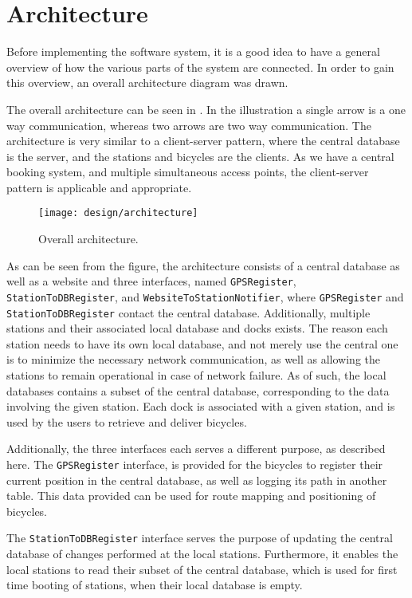\section{Architecture}\label{sec:architecture}
Before implementing the software system, it is a good idea to have a general overview of how the various parts of the system are connected.
In order to gain this overview, an overall architecture diagram was drawn.

The overall architecture can be seen in .
In the illustration a single arrow is a one way communication, whereas two arrows are two way communication.
The architecture is very similar to a client-server pattern, where the central database is the server, and the stations and bicycles are the clients.
As we have a central booking system, and multiple simultaneous access points, the client-server pattern is applicable and appropriate.

\begin{figure}[h]
	\centering
	\texttt{[image: design/architecture]}
	\caption{Overall architecture.}\label{fig:overallarch}
\end{figure}

As can be seen from the figure, the architecture consists of a central database as well as a website and three interfaces, named \texttt{GPSRegister}, \texttt{StationToDBRegister}, and \texttt{WebsiteToStationNotifier}, where \texttt{GPSRegister} and \texttt{StationToDBRegister} contact the central database.
Additionally, multiple stations and their associated local database and docks exists.
The reason each station needs to have its own local database, and not merely use the central one is to minimize the necessary network communication, as well as allowing the stations to remain operational in case of network failure.
As of such, the local databases contains a subset of the central database, corresponding to the data involving the given station.
Each dock is associated with a given station, and is used by the users to retrieve and deliver bicycles.

Additionally, the three interfaces each serves a different purpose, as described here.
The \texttt{GPSRegister} interface, is provided for the bicycles to register their current position in the central database, as well as logging its path in another table.
This data provided can be used for route mapping and positioning of bicycles.

The \texttt{StationToDBRegister} interface serves the purpose of updating the central database of changes performed at the local stations. Furthermore, it enables the local stations to read their subset of the central database, which is used for first time booting of stations, when their local database is empty.

